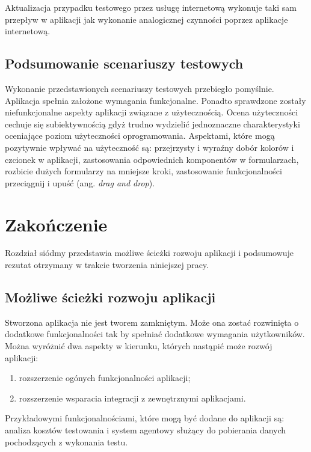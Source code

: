 Aktualizacja przypadku testowego przez usługę internetową wykonuje taki sam przepływ w aplikacji jak wykonanie analogicznej czynności poprzez aplikacje internetową.

\section{Podsumowanie scenariuszy testowych}

Wykonanie przedstawionych scenariuszy testowych przebiegło pomyślnie. Aplikacja spełnia założone wymagania funkcjonalne. Ponadto sprawdzone zostały niefunkcjonalne aspekty aplikacji związane z użytecznością. Ocena użyteczności cechuje się subiektywnością gdyż trudno wydzielić jednoznaczne charakterystyki oceniające poziom użyteczności oprogramowania. Aspektami, które mogą pozytywnie wpływać na użyteczność są: przejrzysty i wyraźny dobór kolorów i czcionek w aplikacji, zastosowania odpowiednich komponentów w formularzach, rozbicie dużych formularzy na mniejsze kroki, zastosowanie funkcjonalności przeciągnij i upuść (ang. \textit{drag and drop}).



\chapter{Zakończenie}

Rozdział siódmy przedstawia możliwe ścieżki rozwoju aplikacji i podsumowuje rezutat otrzymany w trakcie tworzenia niniejszej pracy.

\section{Możliwe ścieżki rozwoju aplikacji}

Stworzona aplikacja nie jest tworem zamkniętym. Może ona zostać rozwinięta o dodatkowe funkcjonalności tak by spełniać dodatkowe wymagania użytkowników. Można wyróżnić dwa aspekty w kierunku, których nastąpić może rozwój aplikacji:
\begin{enumerate}
  \item rozszerzenie ogónych funkcjonalności aplikacji;
  \item rozszerzenie wsparacia integracji z zewnętrznymi aplikacjami.
\end{enumerate}

Przykładowymi funkcjonalnościami, które mogą być dodane do aplikacji są: analiza kosztów testowania i system agentowy służący do pobierania danych pochodzących z wykonania testu.

